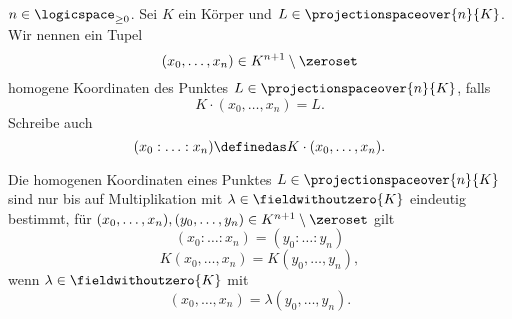 \begin{definition*}
  \( n\in \logicspace _{\geq 0} \). Sei \( K \) ein Körper und \( L\in \projectionspaceover{n}{K} \). Wir nennen ein Tupel
  \begin{equation*}
    (x_0,\dots,x_n)\in K^{n+1}\setminus\zeroset
  \end{equation*}
  homogene Koordinaten des Punktes \( L\in \projectionspaceover{n}{K} \), falls 
  \begin{equation*}
    K\cdot (x_0,\dotsc,x_n)=L.
  \end{equation*}
  Schreibe auch
  \begin{equation*}
    (x_0:\dotsc:x_n)\definedas K\cdot(x_0,\dotsc,x_n).
  \end{equation*}
\end{definition*}
\begin{bemerkung*}
  Die homogenen Koordinaten eines Punktes \( L\in \projectionspaceover{n}{K} \) sind nur bis auf Multiplikation mit \( \lambda\in \fieldwithoutzero{K} \) eindeutig bestimmt, \dh für \( (x_0,\dotsc,x_n),(y_0,\dotsc,y_n)\in K^{n+1}\setminus \zeroset \) gilt
  \begin{equation*}
    (x_0:\dotsc:x_n)=(y_0:\dotsc:y_n)
  \end{equation*}
  \gdw
  \begin{equation*}
    K(x_0,\dotsc,x_n)=K(y_0,\dotsc,y_n),
  \end{equation*}
  \dh wenn \texists  \( \lambda\in \fieldwithoutzero{K} \) mit
  \begin{equation*}
    (x_0,\dotsc,x_n)=\lambda (y_0,\dotsc,y_n).
  \end{equation*}
\end{bemerkung*}
